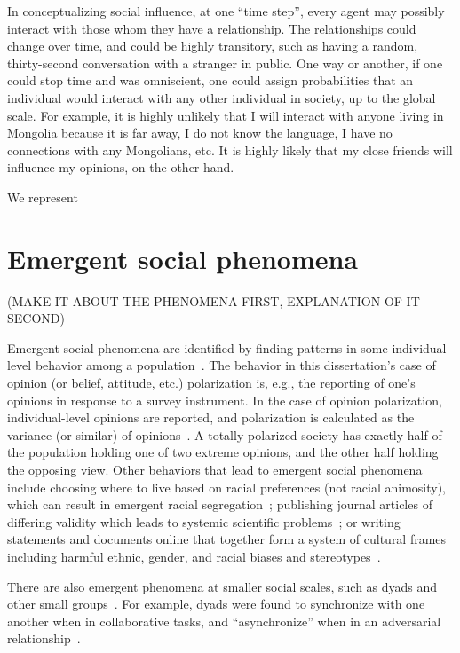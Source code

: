 \documentclass[12pt,letterpaper]{article}
\begin{document}
In conceptualizing social influence, at one ``time step'', every agent may
possibly interact with those whom they have a relationship. The relationships
could change over time, and could be highly transitory, such as having a 
random, thirty-second conversation with a stranger in public. One way or
another, if one could stop time and was omniscient, one could assign 
probabilities that an individual would interact with any other individual
in society, up to the global scale. For example, it is highly unlikely that
I will interact with anyone living in Mongolia because it is far away, I do not
know the language, I have no connections with any Mongolians, etc. It is
highly likely that my close friends will influence my opinions, on the other
hand.

We represent 


\section{Emergent social phenomena}

(MAKE IT ABOUT THE PHENOMENA FIRST, EXPLANATION OF IT SECOND)

Emergent social phenomena are identified by finding patterns in some 
individual-level behavior among a population~\cite{Blau1974,Schelling2006}.
The behavior in this dissertation's case of opinion (or belief, attitude, etc.) 
polarization is, e.g., the reporting of one's opinions in response to a survey
instrument. 
In the case of opinion polarization, 
individual-level opinions are reported, and polarization is calculated 
as the variance (or similar) of opinions~\cite{Bramson2016}. A totally polarized society has
exactly half of the population holding one of two extreme opinions, and the
other half holding the opposing view. 
Other behaviors that lead to emergent social phenomena 
include choosing where to live based on racial preferences (not racial animosity), 
which can result in emergent racial segregation~\cite{Schelling1971}; publishing journal 
articles of differing validity which leads to systemic scientific problems~\cite{Smaldino2019};
or writing statements and documents online that together form a system of 
cultural frames including harmful ethnic, gender, and racial biases and 
stereotypes~\cite{Caliskan2017,Garg2018}. 

There are also emergent phenomena
at smaller social scales, such as dyads and other small groups~\cite{Abney2014a}. 
For example, dyads were found to synchronize with one another when in collaborative
tasks, and ``asynchronize'' when in an adversarial 
relationship~\cite{Abney2014,Ramirez-Aristizabal2018,Schloesser2019,Schneider2020,Abney2021}.
\end{document}
